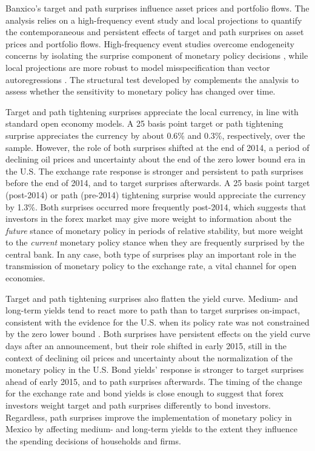 \documentclass[a4paper, 12pt]{article}
\begin{document}
Banxico's target and path surprises influence asset prices and portfolio flows. 
The analysis relies on a high-frequency event study and local projections to quantify the contemporaneous and persistent effects  of target and path surprises on asset prices and portfolio flows. High-frequency event studies overcome endogeneity concerns by isolating the surprise component of monetary policy decisions \parencite{NakamuraSteinsson:2018JEP}, while local projections are more robust to model misspecification than vector autoregressions \parencite{Jorda:2005}. The structural test developed by \textcite{BaiPerron:2003} complements the analysis to assess whether the sensitivity to monetary policy has changed over time. 

Target and path tightening surprises appreciate the local currency, in line with standard open economy models. A 25 basis point target or path tightening surprise appreciates the currency by about 0.6\% and 0.3\%, respectively, over the sample. However, the role of both surprises shifted at the end of 2014, a period of declining oil prices and uncertainty about the end of the zero lower bound era in the U.S. The exchange rate response is stronger and persistent to path surprises before the end of 2014, and to target surprises afterwards. A 25 basis point target (post-2014) or path (pre-2014) tightening surprise would appreciate the currency by 1.3\%. 
Both surprises occurred more frequently post-2014, which suggests that investors in the forex market may give more weight to information about the \textit{future} stance of monetary policy in periods of relative stability, but more weight to the \textit{current} monetary policy stance when they are frequently surprised by the central bank. In any case, both type of surprises play an important role in the transmission of monetary policy to the exchange rate, a vital channel for open economies.

Target and path tightening surprises also flatten the yield curve. 
Medium- and long-term yields tend to react more to path than to target surprises on-impact, consistent with the evidence for the U.S. when its policy rate was not constrained by the zero lower bound \parencite{GSS:2005a,Swanson:2021}. 
Both surprises have persistent effects on the yield curve days after an announcement, but their role shifted in early 2015, still in the context of declining oil prices and uncertainty about the normalization of the monetary policy in the U.S. 
Bond yields' response is stronger to target surprises ahead of early 2015, and to path surprises afterwards. The timing of the change for the exchange rate and bond yields is close enough to suggest that forex investors weight target and path surprises differently to bond investors. 
Regardless, path surprises improve the implementation of monetary policy in Mexico by affecting medium- and long-term yields to the extent they influence the spending decisions of households and firms. 
\end{document}
